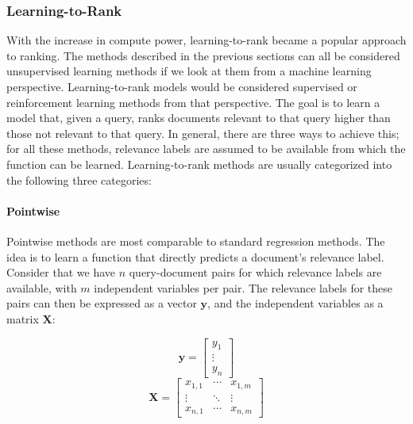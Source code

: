 \subsubsection{Learning-to-Rank}
With the increase in compute power, learning-to-rank became a popular approach to ranking. The methods described in the previous sections can all be considered unsupervised learning methods if we look at them from a machine learning perspective. Learning-to-rank models would be considered supervised or reinforcement learning methods from that perspective. The goal is to learn a model that, given a query, ranks documents relevant to that query higher than those not relevant to that query. In general, there are three ways to achieve this; for all these methods, relevance labels are assumed to be available from which the function can be learned. Learning-to-rank methods are usually categorized into the following three categories: 

\paragraph{Pointwise} Pointwise methods are most comparable to standard regression methods. The idea is to learn a function that directly predicts a document's relevance label. Consider that we have $n$ query-document pairs for which relevance labels are available, with $m$ independent variables per pair. The relevance labels for these pairs can then be expressed as a vector $\mathbf{y}$, and the independent variables as a matrix $\mathbf{X}$:

\begin{multicols}{2}
	\begin{equation}
		\mathbf{y} = 
		\begin{bmatrix}
			y_1 \\
			\vdots \\
			y_n
		\end{bmatrix}
	\end{equation}\break
	\begin{equation}
		\mathbf{X} = 
		\begin{bmatrix}
			x_{1,1} & \cdots & x_{1, m} \\
			\vdots &  \ddots & \vdots \\
			x_{n,1} & \cdots & x_{n, m} 
		\end{bmatrix}
	\end{equation}	
\end{multicols}

